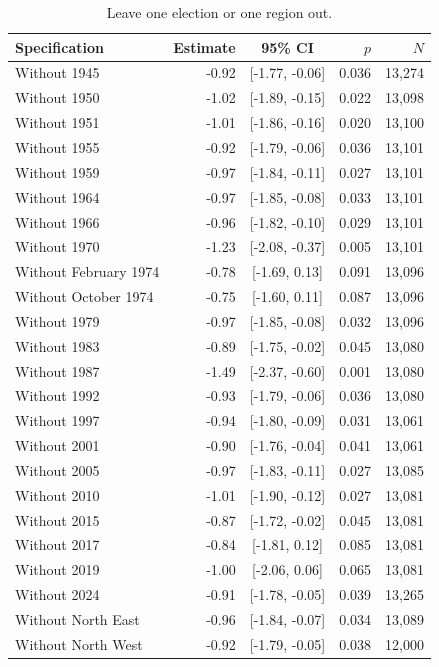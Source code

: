 \documentclass[11pt,a4paper]{article}
\begin{document}
\begin{table}[tbp]\centering\small\caption{Leave one election or one region out.}\label{tab:loo}
\begin{tabular}{p{7.6cm}rcrr}\toprule Specification & Estimate & 95\% CI & $p$ & $N$\\\midrule
Without 1945 & -0.92 & [-1.77, -0.06] & 0.036 & 13,274\\
Without 1950 & -1.02 & [-1.89, -0.15] & 0.022 & 13,098\\
Without 1951 & -1.01 & [-1.86, -0.16] & 0.020 & 13,100\\
Without 1955 & -0.92 & [-1.79, -0.06] & 0.036 & 13,101\\
Without 1959 & -0.97 & [-1.84, -0.11] & 0.027 & 13,101\\
Without 1964 & -0.97 & [-1.85, -0.08] & 0.033 & 13,101\\
Without 1966 & -0.96 & [-1.82, -0.10] & 0.029 & 13,101\\
Without 1970 & -1.23 & [-2.08, -0.37] & 0.005 & 13,101\\
Without February 1974 & -0.78 & [-1.69, 0.13] & 0.091 & 13,096\\
Without October 1974 & -0.75 & [-1.60, 0.11] & 0.087 & 13,096\\
Without 1979 & -0.97 & [-1.85, -0.08] & 0.032 & 13,096\\
Without 1983 & -0.89 & [-1.75, -0.02] & 0.045 & 13,080\\
Without 1987 & -1.49 & [-2.37, -0.60] & 0.001 & 13,080\\
Without 1992 & -0.93 & [-1.79, -0.06] & 0.036 & 13,080\\
Without 1997 & -0.94 & [-1.80, -0.09] & 0.031 & 13,061\\
Without 2001 & -0.90 & [-1.76, -0.04] & 0.041 & 13,061\\
Without 2005 & -0.97 & [-1.83, -0.11] & 0.027 & 13,085\\
Without 2010 & -1.01 & [-1.90, -0.12] & 0.027 & 13,081\\
Without 2015 & -0.87 & [-1.72, -0.02] & 0.045 & 13,081\\
Without 2017 & -0.84 & [-1.81, 0.12] & 0.085 & 13,081\\
Without 2019 & -1.00 & [-2.06, 0.06] & 0.065 & 13,081\\
Without 2024 & -0.91 & [-1.78, -0.05] & 0.039 & 13,265\\
\midrule
Without North East & -0.96 & [-1.84, -0.07] & 0.034 & 13,089\\
Without North West & -0.92 & [-1.79, -0.05] & 0.038 & 12,000\\

\end{tabular}
\end{table}
\end{document}
